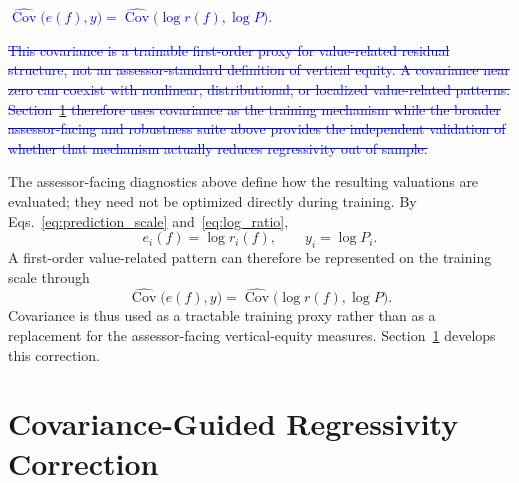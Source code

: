\documentclass[10pt]{article}
\theoremstyle{definition}
\newcommand{\1}{\mathbf{1}}
\begin{document}
{\textcolor{blue}{\sout{$\widehat{\operatorname{Cov}}\bigl(e(f),y\bigr)
=
\widehat{\operatorname{Cov}}\bigl(\log r(f),\log P\bigr).$}}

\textcolor{blue}{\sout{This covariance is a trainable first-order proxy for value-related residual structure, not an assessor-standard definition of vertical equity. A covariance near zero can coexist with nonlinear, distributional, or localized value-related patterns. Section~\ref{sec:method} therefore uses covariance as the training mechanism while the broader assessor-facing and robustness suite above provides the independent validation of whether that mechanism actually reduces regressivity out of sample.}}

{\color{impGreen}

The assessor-facing diagnostics above define how the resulting valuations are
evaluated; they need not be optimized directly during training. By
Eqs.~\eqref{eq:prediction_scale} and~\eqref{eq:log_ratio},
\[
e_i(f)=\log r_i(f),
\qquad
y_i=\log P_i.
\]
A first-order value-related pattern can therefore be represented on the
training scale through
\begin{equation}
\label{eq:training_covariance_bridge}
\widehat{\operatorname{Cov}}\bigl(e(f),y\bigr)
=
\widehat{\operatorname{Cov}}\bigl(\log r(f),\log P\bigr).
\end{equation}
Covariance is thus used as a tractable training proxy rather than as a
replacement for the assessor-facing vertical-equity measures.
Section~\ref{sec:method} develops this correction.

}



\section{Covariance-Guided Regressivity Correction}
\label{sec:method}


}
\end{document}
